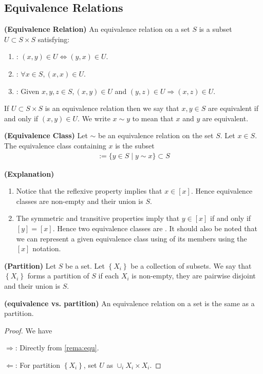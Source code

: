 \documentclass{article}
\newcommand{\bfs}[1]{\textbf{({#1}) }}
\begin{document}
\subsection{Equivalence Relations}
\begin{defa}{\bfs{Equivalence Relation}} An equivalence relation on a set $S$ is a subset $U \subset S \times S$ satisfying:
\begin{enumerate}
    \item {}: $(x, y) \in U \Longleftrightarrow(y, x) \in U .$
    \item {}: $\forall x \in S,(x, x) \in U$.
    \item {}: Given $x, y, z \in S,(x, y) \in U$ and $(y, z) \in U \Rightarrow(x, z) \in U$. 
\end{enumerate}
If $U \subset S \times S$ is an equivalence relation then we say that $x, y \in S$ are equivalent if and only if $(x, y) \in U .$ We write $x \sim y$ to mean that $x$ and $y$ are equivalent.
\end{defa}
\begin{defa}{\bfs{Equivalence Class}}
 Let $\sim$ be an equivalence relation on the set $S .$ Let $x \in S .$ The equivalence class containing $x$ is the subset
\begin{align*}
[x]:=\{y \in S \mid y \sim x\} \subset S
\end{align*}
\end{defa}
\begin{rema}{\bfs{Explanation}}\label{rema:equ}
\begin{enumerate}
    \item Notice that the reflexive property implies that $x \in[x] .$ Hence equivalence classes are non-empty and their union is $S$.
    \item The symmetric and transitive properties imply that $y \in[x]$ if and only if $[y]=[x]$. Hence two equivalence classes are . It should also be noted that we can represent a given equivalence class using  of its members using the $[x]$ notation.
\end{enumerate}
\end{rema}
\begin{defa}{\bfs{Partition}}
 Let $S$ be a set. Let $\left\{X_{i}\right\}$ be a collection of subsets. We say that $\left\{X_{i}\right\}$ forms a partition of $S$ if each $X_{i}$ is non-empty, they are pairwise disjoint and their union is $S$.
\end{defa}
\begin{lema}{\bfs{equivalence vs. partition}}
An equivalence relation on a set is the same as a partition.
\end{lema} 
\begin{proof}We have 

$\Rightarrow$: Directly from  \cref{rema:equ}.

$\Leftarrow$: For partition $\left\{X_{i}\right\}$, set $U$ as $\cup_i X_i\times X_i$.
\end{proof}
\end{document}
